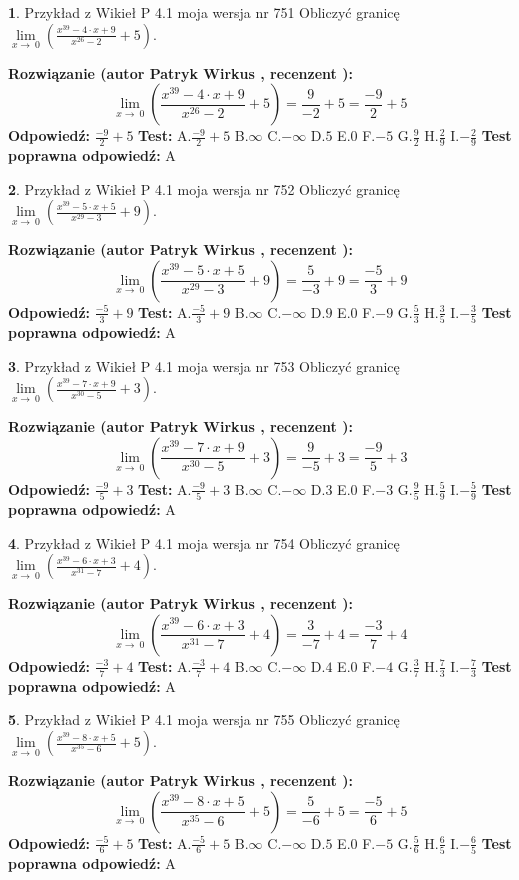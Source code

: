 \documentclass[12pt, a4paper]{article}
\theoremstyle{definition} %
\newtheorem{zad}{}
\newcommand{\zadStart}[1]{\begin{zad}#1\newline}
\newcommand{\zadStop}{\end{zad}}
\newcommand{\rozwStart}[2]{\noindent \textbf{Rozwiązanie (autor #1 , recenzent #2): }\newline}
\newcommand{\rozwStop}{\newline}
\newcommand{\odpStart}{\noindent \textbf{Odpowiedź:}\newline}
\newcommand{\odpStop}{\newline}
\newcommand{\testStart}{\noindent \textbf{Test:}\newline}
\newcommand{\testStop}{\newline}
\newcommand{\kluczStart}{\noindent \textbf{Test poprawna odpowiedź:}\newline}
\newcommand{\kluczStop}{\newline}
\begin{document}
\zadStart{Przykład z Wikieł P 4.1 moja wersja nr 751}
Obliczyć granicę $\lim\limits_{x\to\ 0}(\frac{x^{39}-4 \cdot x +9}{x^{26}-2}+5)$.
\zadStop
\rozwStart{Patryk Wirkus}{}
$$\lim\limits_{x\to\ 0}(\frac{x^{39}-4 \cdot x +9}{x^{26}-2}+5)=\frac{9}{-2}+5=\frac{-9}{2}+5$$
\rozwStop
\odpStart
$\frac{-9}{2}+5$
\odpStop
\testStart
A.$\frac{-9}{2}+5$
B.$\infty$
C.$-\infty$
D.$5$
E.$0$
F.$-5$
G.$\frac{9}{2}$
H.$\frac{2}{9}$
I.$-\frac{2}{9}$
\testStop
\kluczStart
A
\kluczStop



\zadStart{Przykład z Wikieł P 4.1 moja wersja nr 752}
Obliczyć granicę $\lim\limits_{x\to\ 0}(\frac{x^{39}-5 \cdot x +5}{x^{29}-3}+9)$.
\zadStop
\rozwStart{Patryk Wirkus}{}
$$\lim\limits_{x\to\ 0}(\frac{x^{39}-5 \cdot x +5}{x^{29}-3}+9)=\frac{5}{-3}+9=\frac{-5}{3}+9$$
\rozwStop
\odpStart
$\frac{-5}{3}+9$
\odpStop
\testStart
A.$\frac{-5}{3}+9$
B.$\infty$
C.$-\infty$
D.$9$
E.$0$
F.$-9$
G.$\frac{5}{3}$
H.$\frac{3}{5}$
I.$-\frac{3}{5}$
\testStop
\kluczStart
A
\kluczStop



\zadStart{Przykład z Wikieł P 4.1 moja wersja nr 753}
Obliczyć granicę $\lim\limits_{x\to\ 0}(\frac{x^{39}-7 \cdot x +9}{x^{30}-5}+3)$.
\zadStop
\rozwStart{Patryk Wirkus}{}
$$\lim\limits_{x\to\ 0}(\frac{x^{39}-7 \cdot x +9}{x^{30}-5}+3)=\frac{9}{-5}+3=\frac{-9}{5}+3$$
\rozwStop
\odpStart
$\frac{-9}{5}+3$
\odpStop
\testStart
A.$\frac{-9}{5}+3$
B.$\infty$
C.$-\infty$
D.$3$
E.$0$
F.$-3$
G.$\frac{9}{5}$
H.$\frac{5}{9}$
I.$-\frac{5}{9}$
\testStop
\kluczStart
A
\kluczStop



\zadStart{Przykład z Wikieł P 4.1 moja wersja nr 754}
Obliczyć granicę $\lim\limits_{x\to\ 0}(\frac{x^{39}-6 \cdot x +3}{x^{31}-7}+4)$.
\zadStop
\rozwStart{Patryk Wirkus}{}
$$\lim\limits_{x\to\ 0}(\frac{x^{39}-6 \cdot x +3}{x^{31}-7}+4)=\frac{3}{-7}+4=\frac{-3}{7}+4$$
\rozwStop
\odpStart
$\frac{-3}{7}+4$
\odpStop
\testStart
A.$\frac{-3}{7}+4$
B.$\infty$
C.$-\infty$
D.$4$
E.$0$
F.$-4$
G.$\frac{3}{7}$
H.$\frac{7}{3}$
I.$-\frac{7}{3}$
\testStop
\kluczStart
A
\kluczStop



\zadStart{Przykład z Wikieł P 4.1 moja wersja nr 755}
Obliczyć granicę $\lim\limits_{x\to\ 0}(\frac{x^{39}-8 \cdot x +5}{x^{35}-6}+5)$.
\zadStop
\rozwStart{Patryk Wirkus}{}
$$\lim\limits_{x\to\ 0}(\frac{x^{39}-8 \cdot x +5}{x^{35}-6}+5)=\frac{5}{-6}+5=\frac{-5}{6}+5$$
\rozwStop
\odpStart
$\frac{-5}{6}+5$
\odpStop
\testStart
A.$\frac{-5}{6}+5$
B.$\infty$
C.$-\infty$
D.$5$
E.$0$
F.$-5$
G.$\frac{5}{6}$
H.$\frac{6}{5}$
I.$-\frac{6}{5}$
\testStop
\kluczStart
A
\kluczStop
\end{document}
